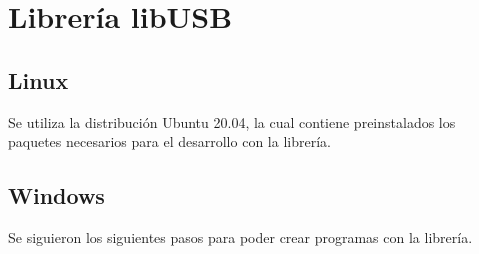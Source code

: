 \documentclass[a4paper,12pt]{report} %
\begin{document}
\section{Librería libUSB}

\subsection{Linux}

Se utiliza la distribución Ubuntu 20.04, la cual contiene preinstalados los paquetes necesarios para el desarrollo con la librería.

\subsection{Windows}

Se siguieron los siguientes pasos para poder crear programas con la librería.
\end{document}

